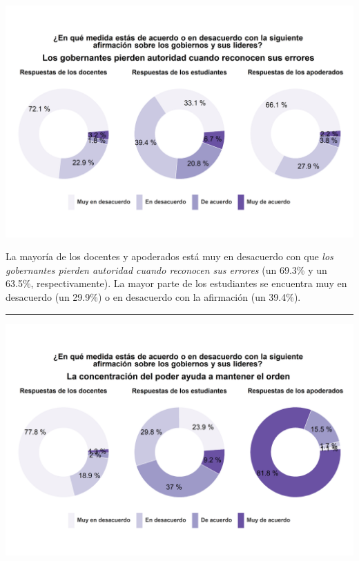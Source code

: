 \documentclass[
  14pt,
]{book}
\let\origfigure\figure
\let\endorigfigure\endfigure
\renewenvironment{figure}[1][2] {
  \expandafter\origfigure\expandafter[H]
} {
  \endorigfigure
}
\begin{document}
\begin{figure}[!ht]

{\centering \includegraphics[width=0.8\linewidth,]{images/graph_aut6} 

}

\caption{Los gobernantes pierden autoridad cuando reconocen sus errores}\label{fig:unnamed-chunk-47}
\end{figure}

La mayoría de los docentes y apoderados está muy en desacuerdo con que \emph{los gobernantes pierden autoridad cuando reconocen sus errores} (un 69.3\% y un 63.5\%, respectivamente). La mayor parte de los estudiantes se encuentra muy en desacuerdo (un 29.9\%) o en desacuerdo con la afirmación (un 39.4\%).

\begin{center}\rule{0.5\linewidth}{0.5pt}\end{center}

\begin{figure}[!ht]

{\centering \includegraphics[width=0.8\linewidth,]{images/graph_aut7} 

}

\caption{Concentrar el poder ayuda a mantener el orden}\label{fig:unnamed-chunk-48}
\end{figure}
\end{document}
